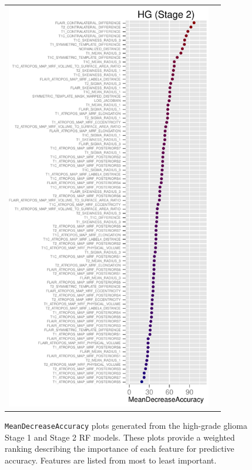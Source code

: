 \documentclass[preprint,authoryear,review,12pt]{elsarticle}
\begin{document}
\begin{figure}
{\begin{tabular}{cc}
  \includegraphics[width=90mm]{Figures/BRATS_HG_MAP_MRF.pdf} \\
  \end{tabular}
  }
  \caption{{\tt MeanDecreaseAccuracy} plots generated from the high-grade glioma
  Stage 1 and Stage 2 RF models.  These plots provide a weighted 
  ranking describing the importance of each feature for predictive accuracy. 
  Features are listed from most to least important.
  }
  \label{fig:hgimportance}
\end{figure}
\end{document}
